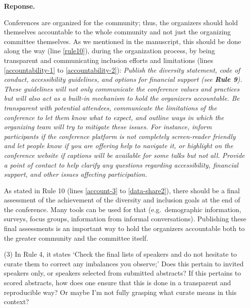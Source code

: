 \documentclass{article}
\newenvironment{Reply}{\noindent\color{BlueViolet}\textbf{Reponse.}}{\vspace{1em}}
\begin{document}
\begin{Reply}

Conferences are organized for the community; thus, the organizers should hold themselves accountable to the whole community and not just the organizing committee themselves.
As we mentioned in the manuscript, this should be done along the way (line \ref{rule10}), during the organization process, by being transparent and communicating inclusion efforts and limitations (lines \ref{accountability-1} to \ref{accountability-2}):
\textit{Publish the diversity statement, code of conduct, accessibility guidelines, and options for financial support (see \textbf{Rule 9}).
These guidelines will not only communicate the conference values and practices but will also act as a built-in mechanism to hold the organizers accountable.
Be transparent with potential attendees, communicate the limitations of the conference to let them know what to expect, and outline ways in which the organizing team will try to mitigate these issues. 
For instance, inform participants if the conference platform is not completely screen-reader friendly and let people know if you are offering help to navigate it, or highlight on the conference website if captions will be available for some talks but not all.
Provide a point of contact to help clarify any questions regarding accessibility, financial support, and other issues affecting participation.}

As stated in Rule 10 (lines \ref{account-3} to \ref{data-share2}), there should be a final assessment of the achievement of the diversity and inclusion goals at the end of the conference. Many tools can be used for that (e.g.\ demographic information, surveys, focus groups, information from informal conversations). 
Publishing these final assessments is an important way to hold the organizers accountable both to the greater community and the committee itself.
\end{Reply}

(3) In Rule 4, it states `Check the final lists of speakers and do not hesitate to curate them to correct any imbalances you observe;' Does this pertain to invited speakers only, or speakers selected from submitted abstracts? If this pertains to scored abstracts, how does one ensure that this is done in a transparent and reproducible way? Or maybe I'm not fully grasping what curate means in this context?
\end{document}

